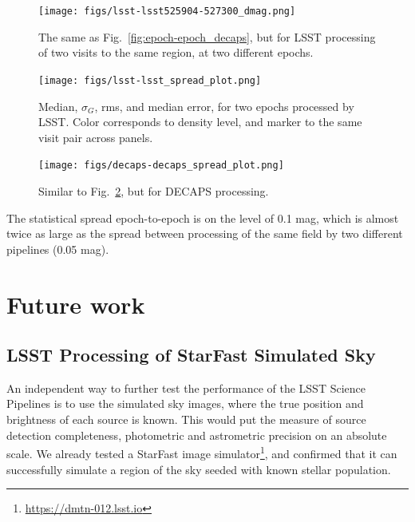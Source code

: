 \documentclass[DM,lsstdraft,toc,usenatbib]{lsstdoc}
\begin{document}

\begin{figure}
\begin{centering}
\texttt{[image: figs/lsst-lsst525904-527300\_dmag.png]}
\caption{The same as Fig.~\ref{fig:epoch-epoch_decaps}, but for LSST processing of  two visits to the same region, at two different epochs.  }
\label{fig:epoch-epoch_lsst}
\end{centering}
\end{figure} 



\begin{figure}
\begin{centering}
\texttt{[image: figs/lsst-lsst\_spread\_plot.png]}
\caption{Median, $\sigma_{G}$,  rms, and  median error, for two epochs processed by LSST. Color corresponds to density level, and marker to the same visit pair across panels. }
\label{fig:epoch_lsst_multiplot}
\end{centering}
\end{figure} 




\begin{figure}
\begin{centering}
\texttt{[image: figs/decaps-decaps\_spread\_plot.png]}
\caption{Similar to Fig.~\ref{fig:epoch_lsst_multiplot}, but for DECAPS processing. }
\label{fig:epoch_decaps_multiplot}
\end{centering}
\end{figure} 


The statistical spread epoch-to-epoch is on the level of 0.1 mag,  which is almost twice as large as the spread between processing of the same field by two different pipelines (0.05 mag). 


\section{Future work}
\label{sec:conclusions}

\subsection{LSST Processing of StarFast Simulated Sky}
An independent way to further test the performance of the LSST Science Pipelines is to use the simulated sky images, where the true position and  brightness of each source is known. This would put the measure of source detection completeness, photometric and astrometric precision on an absolute scale. We already tested a StarFast image simulator\footnote{\url{https://dmtn-012.lsst.io}}, and confirmed that it can successfully simulate a region of the sky seeded with known stellar population.  
\end{document}
